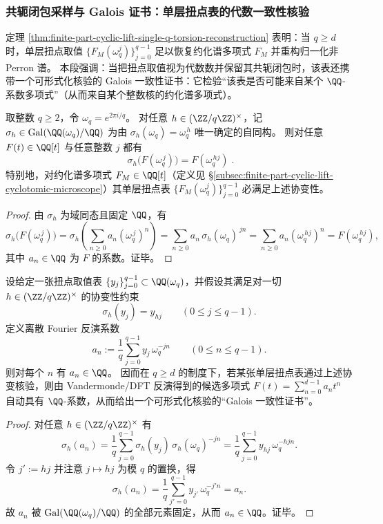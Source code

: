 \subsubsection{共轭闭包采样与 Galois 证书：单层扭点表的代数一致性核验}\label{subsubsec:finite-part-single-layer-torsion-galois-certificate}
定理 \ref{thm:finite-part-cyclic-lift-single-q-torsion-reconstruction} 表明：当 \(q\ge d\) 时，单层扭点取值 \(\{F_M(\omega_q^j)\}_{j=0}^{q-1}\) 足以恢复约化谱多项式 \(F_M\) 并重构归一化非 Perron 谱。
本段强调：当把扭点取值视为代数数并保留其共轭闭包时，该表还携带一个可形式化核验的 Galois 一致性证书：它检验“该表是否可能来自某个 \(\QQ\)-系数多项式”（从而来自某个整数核的约化谱多项式）。

\begin{proposition}\label{prop:finite-part-torsion-table-galois-covariance}
取整数 \(q\ge2\)，令 \(\omega_q=e^{2\pi i/q}\)。
对任意 \(h\in(\ZZ/q\ZZ)^\times\)，记 \(\sigma_h\in\mathrm{Gal}(\QQ(\omega_q)/\QQ)\) 为由 \(\sigma_h(\omega_q)=\omega_q^{\,h}\) 唯一确定的自同构。
则对任意 \(F(t)\in\QQ[t]\) 与任意整数 \(j\) 都有
\[
\boxed{\;\sigma_h\!\bigl(F(\omega_q^{\,j})\bigr)=F(\omega_q^{\,hj})\; }.
\]
特别地，对约化谱多项式 \(F_M\in\QQ[t]\)（定义见 \S\ref{subsec:finite-part-cyclic-lift-cyclotomic-microscope}）其单层扭点表 \(\{F_M(\omega_q^j)\}_{j=0}^{q-1}\) 必满足上述协变性。
\end{proposition}
\begin{proof}
由 \(\sigma_h\) 为域同态且固定 \(\QQ\)，有
\[
\sigma_h\!\bigl(F(\omega_q^{\,j})\bigr)
=\sigma_h\!\left(\sum_{n\ge0}a_n(\omega_q^{\,j})^n\right)
=\sum_{n\ge0}a_n\,\sigma_h(\omega_q)^{\,jn}
=\sum_{n\ge0}a_n(\omega_q^{\,hj})^n
=F(\omega_q^{\,hj}),
\]
其中 \(a_n\in\QQ\) 为 \(F\) 的系数。证毕。
\end{proof}

\begin{corollary}[共轭闭包核验 \texorpdfstring{$\Rightarrow$}{=>} 有理系数证书]\label{cor:finite-part-torsion-table-galois-certificate}
设给定一张扭点取值表 \(\{y_j\}_{j=0}^{q-1}\subset\QQ(\omega_q)\)，并假设其满足对一切 \(h\in(\ZZ/q\ZZ)^\times\) 的协变性约束
\[
\sigma_h(y_j)=y_{hj}\qquad(0\le j\le q-1).
\]
定义离散 Fourier 反演系数
\[
a_n:=\frac{1}{q}\sum_{j=0}^{q-1}y_j\,\omega_q^{-jn}\qquad(0\le n\le q-1).
\]
则对每个 \(n\) 有 \(a_n\in\QQ\)。
因而在 \(q\ge d\) 的制度下，若某张单层扭点表通过上述协变核验，则由 Vandermonde/DFT 反演得到的候选多项式 \(F(t)=\sum_{n=0}^{d-1}a_n t^n\) 自动具有 \(\QQ\)-系数，从而给出一个可形式化核验的“Galois 一致性证书”。
\end{corollary}
\begin{proof}
对任意 \(h\in(\ZZ/q\ZZ)^\times\) 有
\[
\sigma_h(a_n)
=\frac{1}{q}\sum_{j=0}^{q-1}\sigma_h(y_j)\,\sigma_h(\omega_q)^{-jn}
=\frac{1}{q}\sum_{j=0}^{q-1}y_{hj}\,\omega_q^{-hjn}.
\]
令 \(j':=hj\) 并注意 \(j\mapsto hj\) 为模 \(q\) 的置换，得
\[
\sigma_h(a_n)=\frac{1}{q}\sum_{j'=0}^{q-1}y_{j'}\,\omega_q^{-j'n}=a_n.
\]
故 \(a_n\) 被 \(\mathrm{Gal}(\QQ(\omega_q)/\QQ)\) 的全部元素固定，从而 \(a_n\in\QQ\)。证毕。
\end{proof}
